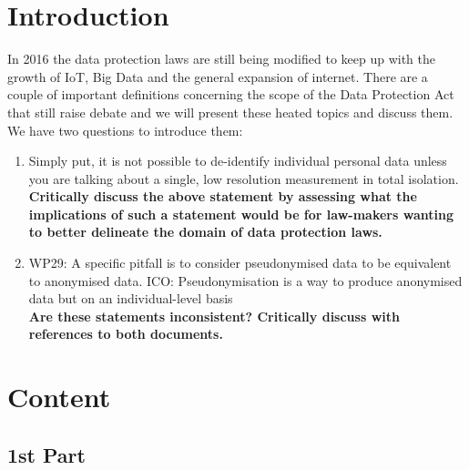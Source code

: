 \documentclass[9pt]{article}
\begin{document}
\section{Introduction}
In 2016 the data protection laws are still being modified to keep up with the growth of IoT, Big Data and the general expansion of internet. There are a couple of important definitions concerning the scope of the Data Protection Act that still raise debate and we will present these heated topics and discuss them.\\
We have two questions to introduce them:
\begin{enumerate}
\item Simply put, it is not possible to de-identify individual personal data unless you are talking about a single, low resolution measurement in total isolation.\\
\textbf{Critically discuss the above statement by assessing what the implications of such a statement would be for law-makers wanting to better delineate the domain of data protection laws.}
\item WP29: A specific  pitfall  is  to consider pseudonymised  data  to  be  equivalent to anonymised data. ICO:  Pseudonymisation is a way to produce anonymised data but on an individual-level basis\\
\textbf{Are these statements inconsistent? Critically discuss with references to both documents. }
\end{enumerate}

\section{Content}
\subsection{1st Part}
\end{document}
